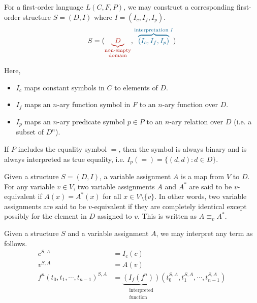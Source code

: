 For a first-order language \(L(C, F, P)\), we may construct a corresponding first-order structure \(S = (D, I)\) where \(I = (I_c, I_f, I_p)\).
%
{\large
    \[
        S = (
            {\color{BrickRed}
                \underbrace{D}_{\substack{
                    \text{non-empty}\\
                    \text{domain}
                }}
            }
            ,
            {\color{MidnightBlue}
                \overbrace{(
                    I_c,
                    I_f,
                    I_p
                )}^{\text{interpretation } I}
            }
        )
    \]
}

Here,
\begin{itemize}
    \item \(I_c\) maps constant symbols in \(C\) to elements of \(D\).
    \item \(I_f\) maps an \(n\)-ary function symbol in \(F\) to an \(n\)-ary function over \(D\).
    \item \(I_p\) maps an \(n\)-ary predicate symbol \(p \in P\) to an \(n\)-ary relation over \(D\) (i.e. a subset of \(D^n\)).
\end{itemize}

If \(P\) includes the equality symbol \(=\), then the symbol is always binary and is always interpreted as true equality, i.e. \(I_p (=) = \{(d, d) : d \in D\}\).

Given a structure \(S = (D, I)\), a variable assignment \(A\) is a map from \(V\) to \(D\). For any variable \(v \in V\), two variable assignments \(A\) and \(A^{*}\) are said to be \(v\)-equivalent if \(A(x) = A^{*}(x)\) for all \(x \in V \setminus \{v\}\). In other words, two variable assignments are said to be \(v\)-equivalent if they are completely identical except possibly for the element in \(D\) assigned to \(v\). This is written as \(A \equiv_v A^{*}\).

Given a structure \(S\) and a variable assignment \(A\), we may interpret any term as follows.
%
\begin{align*}
    c^{S, A} &= I_c (c)\\
    v^{S, A} &= A(v)\\
    f^n (t_0, t_1, \cdots, t_{n-1})^{S, A} &= \underbrace{(I_f (f^n))}_{\substack{\text{interpreted}\\\text{function}}} (t_0^{S, A}, t_1^{S, A}, \cdots, t_{n-1}^{S, A})
\end{align*}

